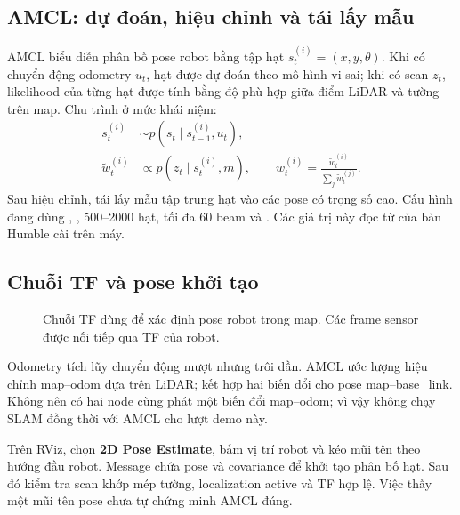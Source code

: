 \subsection{AMCL: dự đoán, hiệu chỉnh và tái lấy mẫu}
AMCL biểu diễn phân bố pose robot bằng tập hạt $s_t^{(i)}=(x,y,\theta)$. Khi có chuyển động odometry $u_t$, hạt được dự đoán theo mô hình vi sai; khi có scan $z_t$, likelihood của từng hạt được tính bằng độ phù hợp giữa điểm LiDAR và tường trên map. Chu trình ở mức khái niệm:
\begin{align}
s_t^{(i)}&\sim p(s_t\mid s_{t-1}^{(i)},u_t),\\
\widetilde w_t^{(i)}&\propto p(z_t\mid s_t^{(i)},m),\qquad
w_t^{(i)}=\frac{\widetilde w_t^{(i)}}{\sum_j\widetilde w_t^{(j)}}.
\end{align}
Sau hiệu chỉnh, tái lấy mẫu tập trung hạt vào các pose có trọng số cao. Cấu hình đang dùng , , 500--2000 hạt, tối đa 60 beam và . Các giá trị này đọc từ  của bản Humble cài trên máy.

\subsection{Chuỗi TF và pose khởi tạo}
\begin{figure}[H]\centering
{}
\caption[Quan hệ các frame map, odom và base link]{Chuỗi TF dùng để xác định pose robot trong map. Các frame sensor được nối tiếp qua TF của robot.}\label{fig:tf}
\end{figure}
Odometry tích lũy chuyển động mượt nhưng trôi dần. AMCL ước lượng hiệu chỉnh map--odom dựa trên LiDAR; kết hợp hai biến đổi cho pose map--base\_link. Không nên có hai node cùng phát một biến đổi map--odom; vì vậy không chạy SLAM đồng thời với AMCL cho lượt demo này.

Trên RViz, chọn \textbf{2D Pose Estimate}, bấm vị trí robot và kéo mũi tên theo hướng đầu robot. Message  chứa pose và covariance để khởi tạo phân bố hạt. Sau đó kiểm tra scan khớp mép tường, localization active và TF hợp lệ. Việc thấy một mũi tên pose chưa tự chứng minh AMCL đúng.

